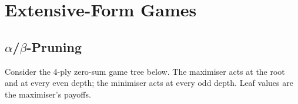 \begin{enumerate}
\end{enumerate}

\clearpage

\section{\points[18] Extensive-Form Games}

\subsection{\points[8] $\alpha$/$\beta$-Pruning}

Consider the 4-ply zero-sum game tree below. The maximiser acts at the root and at every even depth; the minimiser acts at every odd depth. Leaf values are the maximiser's payoffs.
